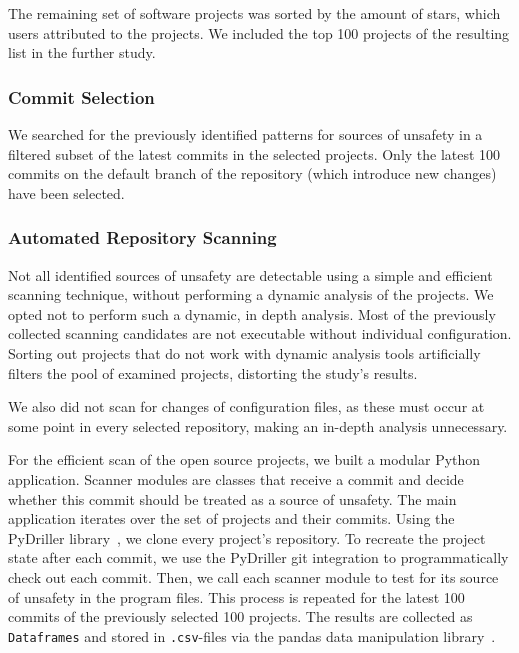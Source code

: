 The remaining set of software projects was sorted by the amount of stars, which users attributed to the
projects. We included the top 100 projects of the resulting list in the further study.

\subsubsection{Commit Selection}

We searched for the previously identified patterns for sources of unsafety in a filtered subset of
the latest commits in the selected projects. Only the latest 100 commits on the default branch of
the repository (which
introduce new changes) have been selected.

\subsubsection{Automated Repository Scanning}\label{sssec:repo_scanning}

Not all identified sources of unsafety are detectable using a simple and efficient scanning
technique, without performing a dynamic analysis of the projects. We opted not to perform
such a dynamic, in depth analysis. Most of the previously collected scanning candidates are not executable
without individual configuration. Sorting out projects that do not
work with dynamic analysis tools artificially filters the pool of examined projects,
distorting the study's results.

We also did not scan for changes of configuration files, as these must occur at some point in every selected
repository, making an in-depth analysis unnecessary.

For the efficient scan of the open source projects, we built a
modular Python application. Scanner modules are classes that receive a commit and decide whether
this commit should be treated as a source of unsafety. The main application iterates over the set of
projects and their commits. Using the PyDriller library~\cite{pydriller}, we clone every project's
repository. To recreate the project state after each commit, we use the PyDriller git integration to
programmatically check out each commit. Then, we call each scanner module to test for its source of
unsafety in the program files. This process is repeated for the latest 100 commits of the previously
selected 100 projects. The results are collected as \texttt{Dataframes} and stored in \texttt{.csv}-files via
the pandas data manipulation library~\cite{pandas}.

